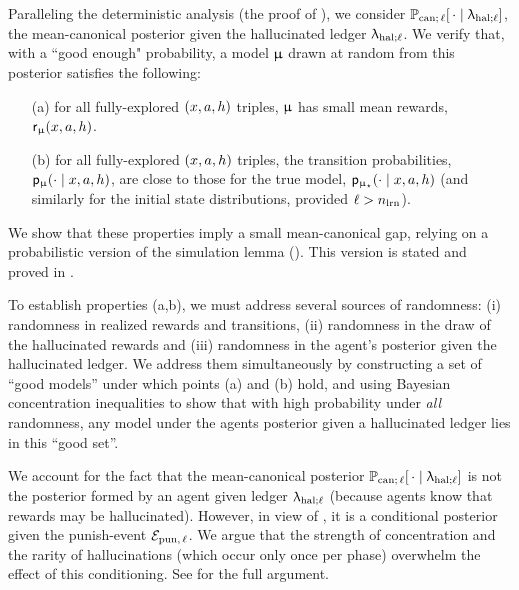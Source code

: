 Paralleling the deterministic analysis (\ie the proof of ), we consider
    $\operatorname{\mathbb{P}}_{\mathrm{can};\,\ell}[\,\cdot \mid\uplambda_{\mathrm{hal};\ell}]$,
the mean-canonical posterior given the hallucinated ledger $\uplambda_{\mathrm{hal};\ell}$. We verify that, with a ``good enough" probability, a model $\upmu$ drawn at random from this posterior satisfies the following:
\begin{itemize}
\item[(a)] for all fully-explored $(x,a,h)$ triples, $\upmu$ has small mean rewards, $\mathsf{r}_{\upmu}(x,a,h)$.
\item[(b)] for all fully-explored $(x,a,h)$ triples, the transition probabilities, $\mathsf{p}_{\upmu}(\cdot \mid x,a,h)$, are close to those for the true model, $\mathsf{p}_{\upmu_{\star}}(\cdot \mid x,a,h)$ (and similarly for the initial state distributions, provided $\ell > n_{\mathrm{lrn}}$).
\end{itemize}
We show that these properties imply a small mean-canonical gap, relying on a probabilistic version of the  simulation lemma (). This version is stated and proved in .

To establish properties (a,b), we must address several sources of randomness: (i) randomness in realized rewards and transitions, (ii) randomness in the draw of the hallucinated rewards and (iii) randomness in the agent's posterior given the hallucinated ledger. We address them simultaneously by constructing a set of ``good models'' under which points (a) and (b) hold, and using Bayesian concentration inequalities to show that with high probability under \emph{all} randomness, any model under the agents posterior given a hallucinated ledger lies in this ``good set''.

We account for the fact that the mean-canonical posterior
    $\operatorname{\mathbb{P}}_{\mathrm{can};\,\ell}[\,\cdot \mid\uplambda_{\mathrm{hal};\ell}]$
is not the posterior formed by an agent given ledger $\uplambda_{\mathrm{hal};\ell}$ (because agents know that rewards may be hallucinated).
However, in view of ,
it is a conditional posterior given the punish-event $\mathcal{E}_{\mathrm{pun},\,\ell}$. We argue that the strength of concentration and the rarity of hallucinations (which occur only once per phase) overwhelm the effect of this conditioning. See  for the full argument.

